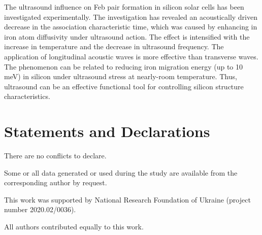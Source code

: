 \documentclass[sn-mathphys]{sn-jnl}%
\theoremstyle{thmstyleone}%
\theoremstyle{thmstyletwo}%
\theoremstyle{thmstylethree}%
\begin{document}
The ultrasound influence on Feb pair formation in silicon solar cells has been investigated experimentally.
The investigation has revealed an acoustically driven decrease in the association characteristic time,
which was caused by enhancing in iron atom diffusivity under ultrasound action.
The effect is intensified with the increase in temperature and the decrease in ultrasound frequency.
The application of longitudinal acoustic waves is more effective than transverse waves.
The phenomenon can be related to reducing iron migration energy (up to 10 meV) in silicon
under ultrasound stress at nearly-room temperature.
Thus, ultrasound can be an effective functional tool for controlling silicon structure characteristics.

\backmatter


%

\section*{Statements and Declarations}

There are no conflicts to declare.

Some or all data generated or used during the study are available from the corresponding author by request.

This work was supported by National Research Foundation  of Ukraine (project number 2020.02/0036).

All authors contributed equally to this work.

%
%




\end{document}

